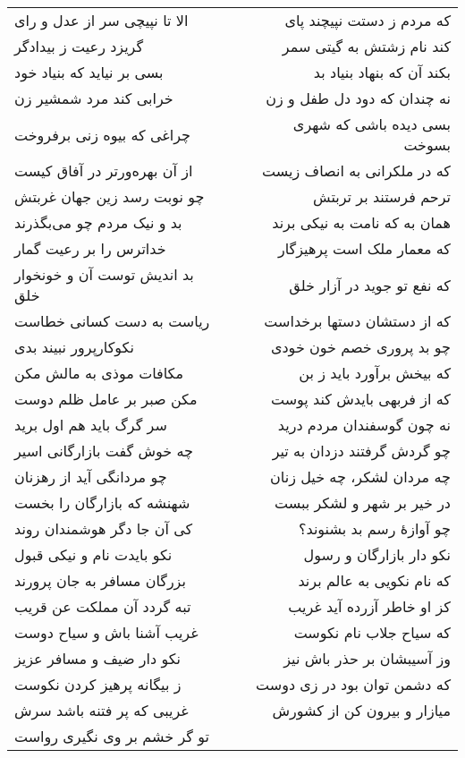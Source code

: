 \begin{center}
\begin{longtable}{l p{0.5cm} r}
\\
الا تا نپیچی سر از عدل و رای
&&
که مردم ز دستت نپیچند پای
\\
گریزد رعیت ز بیدادگر
&&
کند نام زشتش به گیتی سمر
\\
بسی بر نیاید که بنیاد خود
&&
بکند آن که بنهاد بنیاد بد
\\
خرابی کند مرد شمشیر زن
&&
نه چندان که دود دل طفل و زن
\\
چراغی که بیوه زنی برفروخت
&&
بسی دیده باشی که شهری بسوخت
\\
از آن بهره‌ورتر در آفاق کیست
&&
که در ملکرانی به انصاف زیست
\\
چو نوبت رسد زین جهان غربتش
&&
ترحم فرستند بر تربتش
\\
بد و نیک مردم چو می‌بگذرند
&&
همان به که نامت به نیکی برند
\\
خداترس را بر رعیت گمار
&&
که معمار ملک است پرهیزگار
\\
بد اندیش توست آن و خونخوار خلق
&&
که نفع تو جوید در آزار خلق
\\
ریاست به دست کسانی خطاست
&&
که از دستشان دستها برخداست
\\
نکوکارپرور نبیند بدی
&&
چو بد پروری خصم خون خودی
\\
مکافات موذی به مالش مکن
&&
که بیخش برآورد باید ز بن
\\
مکن صبر بر عامل ظلم دوست
&&
که از فربهی بایدش کند پوست
\\
سر گرگ باید هم اول برید
&&
نه چون گوسفندان مردم درید
\\
چه خوش گفت بازارگانی اسیر
&&
چو گردش گرفتند دزدان به تیر
\\
چو مردانگی آید از رهزنان
&&
چه مردان لشکر، چه خیل زنان
\\
شهنشه که بازارگان را بخست
&&
در خیر بر شهر و لشکر ببست
\\
کی آن جا دگر هوشمندان روند
&&
چو آوازهٔ رسم بد بشنوند؟
\\
نکو بایدت نام و نیکی قبول
&&
نکو دار بازارگان و رسول
\\
بزرگان مسافر به جان پرورند
&&
که نام نکویی به عالم برند
\\
تبه گردد آن مملکت عن قریب
&&
کز او خاطر آزرده آید غریب
\\
غریب آشنا باش و سیاح دوست
&&
که سیاح جلاب نام نکوست
\\
نکو دار ضیف و مسافر عزیز
&&
وز آسیبشان بر حذر باش نیز
\\
ز بیگانه پرهیز کردن نکوست
&&
که دشمن توان بود در زی دوست
\\
غریبی که پر فتنه باشد سرش
&&
میازار و بیرون کن از کشورش
\\
تو گر خشم بر وی نگیری رواست

\end{longtable}
\end{center}
